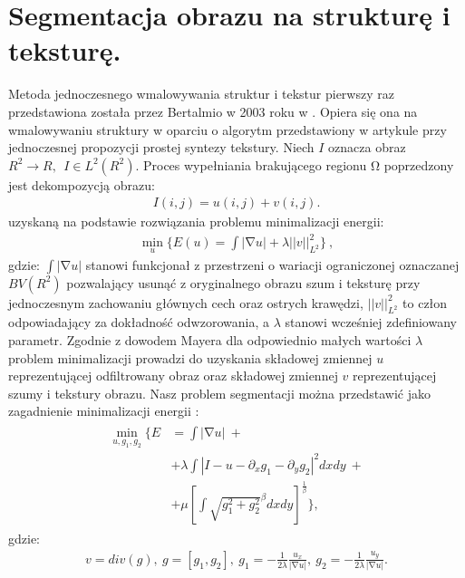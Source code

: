 \documentclass[12pt, twoside, openany]{report}
\theoremstyle{definition}
\begin{document}
\section{Segmentacja obrazu na strukturę i teksturę.}\label{sec:StructureTextureNavierStokes}
Metoda jednoczesnego wmalowywania struktur i tekstur pierwszy raz przedstawiona została przez Bertalmio w 2003 roku w \cite{NavierStokesAndTexturePropagation}. Opiera się ona na wmalowywaniu struktury w oparciu o algorytm przedstawiony w artykule przy jednoczesnej propozycji prostej syntezy tekstury. Niech $I$ oznacza obraz $R^2\to R,\ \ I\in L^2(R^2)$. Proces wypełniania brakującego regionu $\mathrm{\Omega }$ poprzedzony jest dekompozycją obrazu:
\begin{align}
I\left(i,j\right)=u\left(i,j\right)+v\left(i,j\right).
\label{STRUCTURETEXTURE1}
\end{align}
uzyskaną na podstawie rozwiązania problemu minimalizacji energii:
\begin{align} 
{\mathop{\mathrm{min}}_{u} \Biggl\{E\left(u\right)=\int{\left|\mathrm{\nabla }u\right|+\lambda {\left|\left|v\right|\right|}^2_{L^2}}\Biggr\}\ },
\label{STRUCTURETEXTURE2}
\end{align}
gdzie: $\int{\left|\mathrm{\nabla }u\right|}$ stanowi funkcjonał z przestrzeni o wariacji ograniczonej oznaczanej $BV(R^2)$ pozwalający usunąć z oryginalnego obrazu szum i teksturę przy jednoczesnym zachowaniu głównych cech oraz ostrych krawędzi, ${\left|\left|v\right|\right|}^2_{L^2}$ to człon odpowiadający za dokładność odwzorowania, a $\lambda $ stanowi wcześniej zdefiniowany parametr. Zgodnie z dowodem Mayera \cite{meyer2001oscillating} dla odpowiednio małych wartości $\lambda $ problem minimalizacji prowadzi do uzyskania składowej zmiennej $u$ reprezentującej odfiltrowany obraz oraz składowej zmiennej $v$ reprezentującej szumy i tekstury obrazu. Nasz problem segmentacji można przedstawić jako zagadnienie minimalizacji energii \cite{vese2003modeling}:
\begin{align}
\begin{aligned} 
\mathop{\mathrm{min}}_{u,g_1,g_2} \Biggl\{E &= \int{\left|\mathrm{\nabla }u\right| } \ + \\
&+\lambda \int{\left|I-u-\partial_x g_1- \partial_y g_2 \right|}^2dxdy \ +\\
&+ \mu {\left[\int{{\sqrt{g^2_1+g^2_2}}^\beta dxdy}\right]}^{\frac{1}{\beta}}\Biggr\},
\end{aligned}
\end{align}
gdzie:
\begin{align}
v=div(g),\ g=\left[ g_1,g_2 \right],\ g_1=-\frac{1}{2\lambda }\frac{u_x}{\left|\mathrm{\nabla }u\right|},\ g_2=-\frac{1}{2\lambda }\frac{u_y}{\left|\mathrm{\nabla }u\right|}.
\label{VG1G2}
\end{align}
\end{document}
